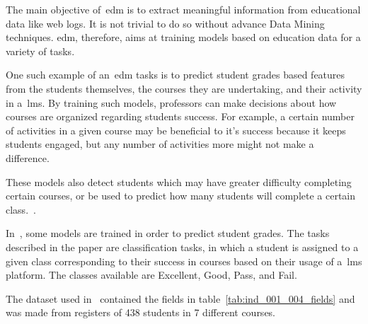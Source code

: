 The main objective of~\gls{edm} is to extract meaningful information from
educational data like web logs. It is not trivial to do so without advance Data
Mining techniques. \gls{edm}, therefore, aims at training models based on
education data for a variety of tasks.

One such example of an~\gls{edm} tasks is to predict student grades based
features from the students themselves, the courses they are undertaking, and
their activity in a~\gls{lms}. By training such models, professors can make
decisions about how courses are organized regarding students success. For
example, a certain number of activities in a given course may be beneficial to
it's success because it keeps students engaged, but any number of activities
more might not make a difference.~\cite{ind_001, ind_002, ind_005}

These models also detect students which may have greater difficulty completing
certain courses, or be used to predict how many students will complete a
certain class.~\cite{ind_007, ind_008}.

In~\cite{ind_001}, some models are trained in order to predict student grades.
The tasks described in the paper are classification tasks, in which a student
is assigned to a given class corresponding to their success in courses based on
their usage of a~\gls{lms} platform. The classes available are Excellent, Good,
Pass, and Fail.

The dataset used in~\cite{ind_001} contained the fields in
table~\ref{tab:ind_001_004_fields} and was made from registers of 438 students
in 7 different courses.

